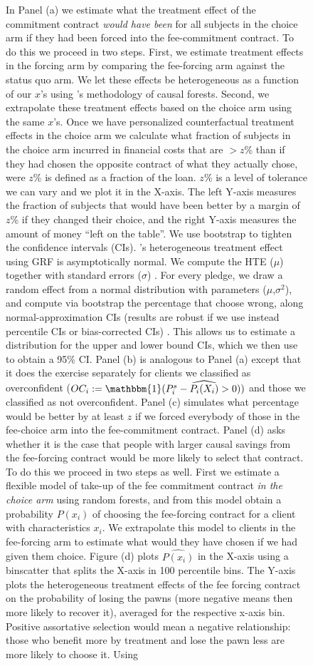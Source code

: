 \documentclass[oneside,11pt]{article}
\begin{document}
\begin{figure}[H]
\begin{center}
    \end{center}
        \scriptsize
        In Panel (a) we estimate what the treatment effect of the commitment contract \textit{would have been} for all subjects in the choice arm if they had been forced into the fee-commitment contract. To do this we proceed in two steps. First, we estimate treatment effects in the forcing arm by comparing the fee-forcing arm against the status quo arm. We let these effects be heterogeneous as a function of our $x$'s using \cite{atheygrf}'s methodology of causal forests. Second, we extrapolate these treatment effects based on the choice arm using the same $x$'s. Once we have personalized counterfactual treatment effects in the choice arm we calculate what fraction of subjects in the choice arm incurred in financial costs that are  $> z$\% than if they had chosen the opposite contract of what they actually chose, were $z$\% is defined as a fraction of the loan. $z$\% is a level of tolerance we can vary and we plot it in the X-axis. The left Y-axis measures the fraction of subjects that would have been better by a margin of $z$\% if they changed their choice, and the right Y-axis measures the amount of money ``left on the table''. We use bootstrap to tighten the confidence intervals (CIs). \cite{atheygrf}'s heterogeneous treatment effect using GRF is asymptotically normal. We compute the HTE ($\mu$) together with standard errors ($\sigma$) . For every pledge, we draw a random effect from a normal distribution with parameters ($\mu$,$\sigma^2$), and compute via bootstrap the percentage that choose wrong, along normal-approximation CIs (results are robust if we use instead percentile CIs or bias-corrected CIs) . This allows us to estimate a distribution for the upper and lower bound CIs, which we then use to obtain a 95\% CI. Panel (b) is analogous to Panel (a) except that it does the exercise separately for clients we classified as overconfident ($OC_i:=\mathbbm{1}(P^s_i-\widehat{P_i(X_i)}>0))$ and those we classified as not overconfident. Panel (c) simulates what percentage would be better by at least $z$ if we forced everybody of those in the fee-choice arm into the fee-commitment contract. Panel (d) asks whether it is the case that people with larger causal savings from the fee-forcing contract would be more likely to select that contract. To do this we proceed in two steps as well. First we estimate a flexible model of take-up of the fee commitment contract \textit{in the choice arm} using random forests, and from this model obtain a probability $P(x_i)$ of choosing the fee-forcing contract for a client with characteristics $x_i$. We extrapolate this model to clients in the fee-forcing arm to estimate what would they have chosen if we had given them choice. Figure (d) plots $\widehat{P(x_i)}$ in the X-axis using a binscatter that splits the X-axis in 100 percentile bins. The Y-axis plots the heterogeneous treatment effects of the fee forcing contract on the probability of losing the pawns (more negative means then more likely to recover it), averaged for the respective x-axis bin. Positive assortative selection would mean a negative relationship: those who benefit more by treatment and lose the pawn less are more likely to choose it.  Using 
\end{figure}
\end{document}
